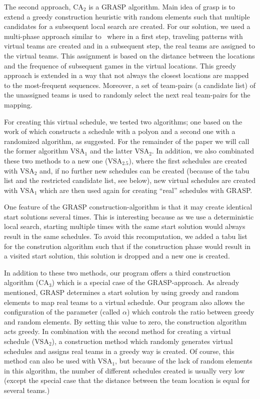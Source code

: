 \documentclass[a4paper,11pt]{article}
\begin{document}
The second approach, $\text{CA}_2$ is a \ac{GRASP} algorithm. Main idea of grasp is to extend a greedy construction heuristic with random elements such that multiple candidates for a subsequent local search are created.
For our solution, we used a multi-phase approach similar to~\cite{Ribeiro04heuristicsfor} where in a first step, traveling patterns with virtual
teams are created and in a subsequent step, the real teams are assigned to the virtual teams.
This assignment is based on the distance between the locations and the frequence of subsequent games in the virtual locations.
This greedy approach is extended in a way that not always the closest locations are mapped to the most-frequent sequences.
Moreover, a set of team-pairs (a candidate list) of the unassigned teams
is used to randomly select the next real team-pairs for the mapping.

For creating this virtual schedule, we tested two algorithms; one based on the work of \cite{Gaspero07} which constructs a schedule with a polyon and a second one with a randomized algorithm, as \cite{Anagnostopoulos06} suggested.
For the remainder of the paper we will call the former algorithm $\text{VSA}_1$ and the latter $\text{VSA}_2$.
In addition, we also combinated these two methods to a new one ($\text{VSA}_{2.5}$), where the first schedules are created with $\text{VSA}_2$ and, if no further new schedules can be created
(because of the tabu list and the restricted candidate list, see below), new virtual schedules are created with $\text{VSA}_1$ which are then used again for creating ``real'' schedules with \ac{GRASP}.

One feature of the GRASP construction-algorithm is that it may create identical start solutions several times.
This is interesting because as we use a deterministic local search, starting multiple times with the same start solution would always result in the same schedules.
To avoid this recomputation, we added a tabu list for the constrution algorithm such that if the construction phase would result in a visited start solution, this solution is dropped and a new one is created.

In addition to these two methods, our program offers a third construction algorithm ($\text{CA}_3$) which is a special case of the \ac{GRASP}-approach. As already mentioned, \ac{GRASP} determines a start solution by using greedy and random elements to map real teams to a virtual schedule.
 Our program also allows the configuration of the parameter (called $\alpha$) which controls the ratio between greedy and random elements.
By setting this value to zero, the construction algorithm acts greedy.
In combination with the second method for creating a virtual schedule ($\text{VSA}_2$), a construction method which randomly generates virtual schedules and assigns real teams in a greedy way is created.
Of course, this method can also be used with $\text{VSA}_1$, but because of the lack of random elements in this algorithm, the number of different schedules created is usually very low (except the special case that the
distance between the team location is equal for several teams.)
\end{document}
